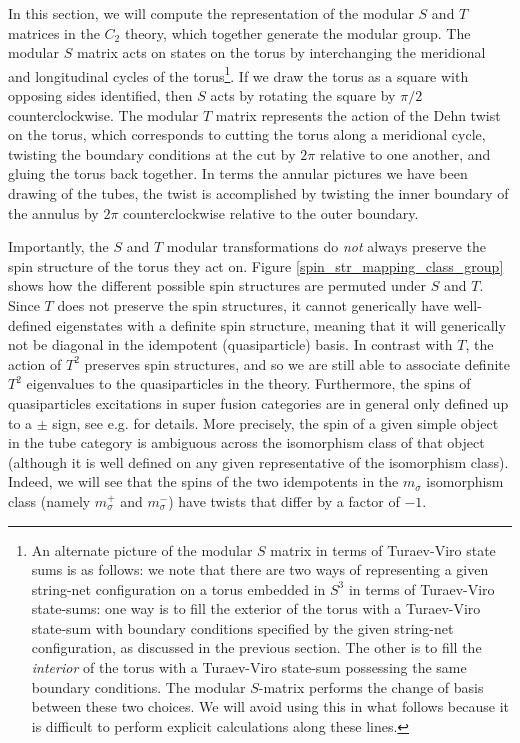 \documentclass[12pt,a4paper]{article}
\begin{document}
In this section, we will compute the representation of the modular $S$ and $T$ matrices in the $C_2$ theory, which together generate the modular group. 
The modular $S$ matrix acts on states on the torus by interchanging the meridional and longitudinal cycles 
of the torus\footnote{An alternate picture of the modular $S$ matrix in terms of Turaev-Viro state sums 
is as follows: we note that there are two ways of representing a given string-net configuration on a torus embedded 
in $S^3$ in terms of Turaev-Viro state-sums: one way is to fill the exterior of the torus with a 
Turaev-Viro state-sum with boundary conditions specified by the given string-net configuration, as discussed in the previous section. 
The other is to fill the {\it interior} of the torus with a Turaev-Viro state-sum possessing the same boundary conditions. 
The modular $S$-matrix performs the change of basis between these two choices.
We will avoid using this in what follows because it is difficult to perform explicit calculations along these lines.}. 
If we draw the torus as a square with opposing sides identified, then $S$ acts by rotating the square by $\pi/2$ counterclockwise. 
The modular $T$ matrix represents the action of the Dehn twist on the torus, 
which corresponds to cutting the torus along a meridional cycle, 
twisting the boundary conditions at the cut by $2\pi$ relative to one another, and gluing the torus back together.
In terms the annular pictures we have been drawing of the tubes, the twist is accomplished by 
twisting the inner boundary of the annulus by $2\pi$ counterclockwise relative to the outer boundary. 

Importantly, the $S$ and $T$ modular transformations do {\it not} always preserve the spin structure of the torus they act on. 
Figure \ref{spin_str_mapping_class_group} shows how the different possible spin structures are permuted under $S$ and $T$. 
Since $T$ does not preserve the spin structures, it cannot generically have well-defined eigenstates with a definite spin structure,
meaning that it will generically not be diagonal in the idempotent (quasiparticle) basis. 
In contrast with $T$, the action of $T^2$ preserves spin structures, and so we are still able to associate 
definite $T^2$ 
eigenvalues to the quasiparticles in the theory.
Furthermore, the spins of quasiparticles excitations in super fusion categories are in general only defined 
up to a $\pm$ sign, see e.g. \cite{cano2014,bruillard2017,gu2014} for details.
More precisely, the spin of a given simple object in the tube category is ambiguous across the isomorphism 
class of that object (although it is well defined on any given representative of the isomorphism class). 
Indeed, we will see that the spins of the two idempotents in the $m_\sigma$ isomorphism class (namely $m_\sigma^+$ and 
$m_\sigma^-$) have twists that differ by a factor of $-1$. 
\end{document}
